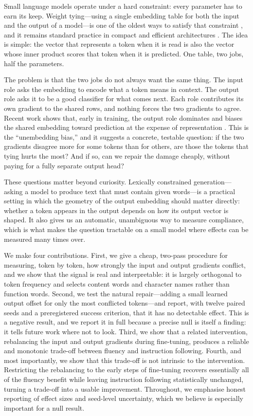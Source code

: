 \documentclass[conference]{IEEEtran}
\begin{document}
Small language models operate under a hard constraint: every parameter has to
earn its keep. Weight tying---using a single embedding table for both the input
and the output of a model---is one of the oldest ways to satisfy that constraint
\cite{inan,press}, and it remains standard practice in compact and efficient
architectures \cite{albert}. The idea is simple: the vector that represents a
token when it is read is also the vector whose inner product scores that token
when it is predicted. One table, two jobs, half the parameters.

The problem is that the two jobs do not always want the same thing. The input
role asks the embedding to encode what a token means in context. The output role
asks it to be a good classifier for what comes next. Each role contributes its
own gradient to the shared rows, and nothing forces the two gradients to agree.
Recent work shows that, early in training, the output role dominates and biases
the shared embedding toward prediction at the expense of representation
\cite{lopardo}. This is the ``unembedding bias,'' and it suggests a concrete,
testable question: if the two gradients disagree more for some tokens than for
others, are those the tokens that tying hurts the most? And if so, can we repair
the damage cheaply, without paying for a fully separate output head?

These questions matter beyond curiosity. Lexically constrained generation---asking
a model to produce text that must contain given words---is a practical setting
in which the geometry of the output embedding should matter directly: whether a
token appears in the output depends on how its output vector is shaped. It also
gives us an automatic, unambiguous way to measure compliance, which is what
makes the question tractable on a small model where effects can be measured many
times over.

We make four contributions. First, we give a cheap, two-pass procedure for
measuring, token by token, how strongly the input and output gradients conflict,
and we show that the signal is real and interpretable: it is largely orthogonal
to token frequency and selects content words and character names rather than
function words. Second, we test the natural repair---adding a small learned
output offset for only the most conflicted tokens---and report, with twelve
paired seeds and a preregistered success criterion, that it has no detectable
effect. This is a negative result, and we report it in full because a precise
null is itself a finding: it tells future work where not to look. Third, we show
that a related intervention, rebalancing the input and output gradients during
fine-tuning, produces a reliable and monotonic trade-off between fluency and
instruction following. Fourth, and most importantly, we show that this trade-off
is not intrinsic to the intervention. Restricting the rebalancing to the early
steps of fine-tuning recovers essentially all of the fluency benefit while
leaving instruction following statistically unchanged, turning a trade-off into
a usable improvement. Throughout, we emphasise honest reporting of effect sizes
and seed-level uncertainty, which we believe is especially important for a null
result.
\end{document}
